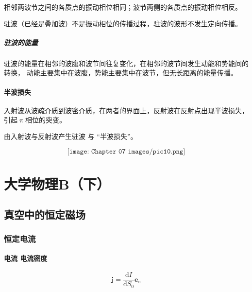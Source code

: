 \documentclass[
	12pt, %
	a4paper, %
]{myLegrandOrangeBook}
\newcommand{\rmd}{\mathrm{d}}
\newcommand{\deriv}[2]{\frac{\rmd #1}{\rmd #2}}
\begin{document}
    相邻两波节之间的各质点的振动相位相同；波节两侧的各质点的振动相位相反。

    驻波（已经是叠加波）不是振动相位的传播过程，驻波的波形不发生定向传播。

\subsubsection{驻波的能量}

    驻波的能量在相邻的波腹和波节间往复变化，在相邻的波节间发生动能和势能间的转换，
    动能主要集中在波腹，势能主要集中在波节，但无长距离的能量传播。

\subsection{半波损失}

    入射波从波疏介质到波密介质，在两者的界面上，反射波在反射点出现半波损失，
    引起\(\uppi\)相位的突变。

    由入射波与反射波产生驻波 与 “半波损失”。

    \[
        \texttt{[image: Chapter 07 images/pic10.png]}
    \]

\part{大学物理B（下）}

\chapterspaceabove{6.25cm} %
\chapterspacebelow{7.5cm} %

\chapter{真空中的恒定磁场}

\section{恒定电流}

\subsection{电流 \quad 电流密度}

\begin{equation}
    \mathbf{j} = \deriv{I}{S_0} \mathbf{e}_{\text{n}}
\end{equation}
\end{document}
